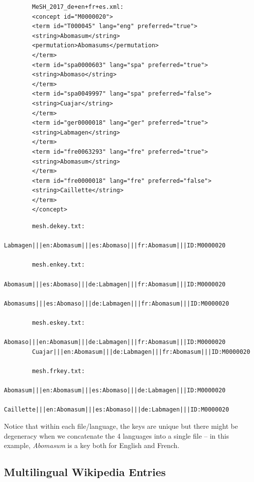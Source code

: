 \documentclass[a4paper,11pt]{article}
\begin{document}
	{\small 
		\lstset{language=XML}
		\begin{lstlisting} 
		MeSH_2017_de+en+fr+es.xml:
		<concept id="M0000020">
		<term id="T000045" lang="eng" preferred="true">
		<string>Abomasum</string>
		<permutation>Abomasums</permutation>
		</term>
		<term id="spa0000603" lang="spa" preferred="true">
		<string>Abomaso</string>
		</term>
		<term id="spa0049997" lang="spa" preferred="false">
		<string>Cuajar</string>
		</term>
		<term id="ger0000018" lang="ger" preferred="true">
		<string>Labmagen</string>
		</term>
		<term id="fre0063293" lang="fre" preferred="true">
		<string>Abomasum</string>
		</term>
		<term id="fre0000018" lang="fre" preferred="false">
		<string>Caillette</string>
		</term>
		</concept>
		\end{lstlisting}
		
		\begin{lstlisting} 
		mesh.dekey.txt:
		Labmagen|||en:Abomasum|||es:Abomaso|||fr:Abomasum|||ID:M0000020
		
		mesh.enkey.txt:
		Abomasum|||es:Abomaso|||de:Labmagen|||fr:Abomasum|||ID:M0000020
		Abomasums|||es:Abomaso|||de:Labmagen|||fr:Abomasum|||ID:M0000020
		
		mesh.eskey.txt:       
		Abomaso|||en:Abomasum|||de:Labmagen|||fr:Abomasum|||ID:M0000020
		Cuajar|||en:Abomasum|||de:Labmagen|||fr:Abomasum|||ID:M0000020
		
		mesh.frkey.txt:  
		Abomasum|||en:Abomasum|||es:Abomaso|||de:Labmagen|||ID:M0000020
		Caillette|||en:Abomasum|||es:Abomaso|||de:Labmagen|||ID:M0000020
		\end{lstlisting}
	}
	
	
	Notice that within each file/language, the keys are unique but there might be degeneracy when we concatenate the 4 languages into a single file -- in this example, \emph{Abomasum} is a key both for English and French.
	
	\subsection{Multilingual Wikipedia Entries}
	\label{ss:wpLex}
	
\end{document}
